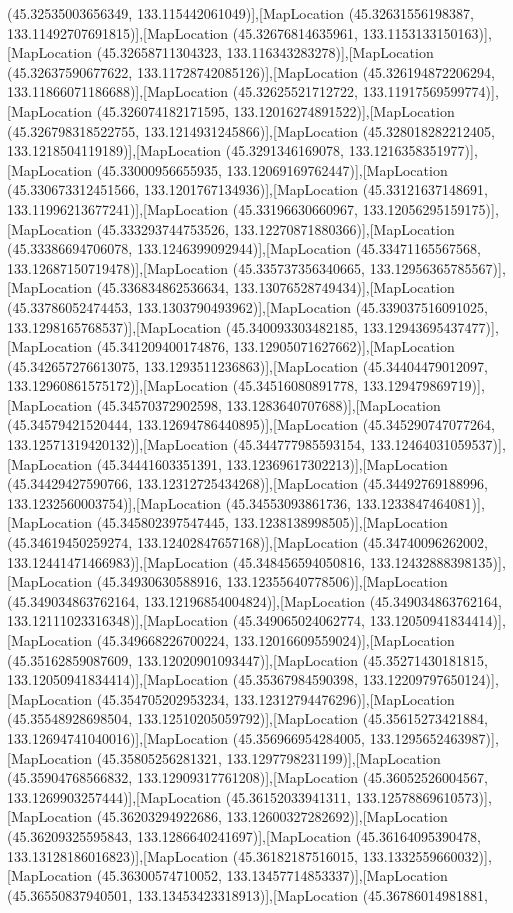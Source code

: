(45.32535003656349, 133.115442061049)],[MapLocation (45.32631556198387, 133.11492707691815)],[MapLocation (45.32676814635961, 133.1153133150163)],[MapLocation (45.32658711304323, 133.116343283278)],[MapLocation (45.32637590677622, 133.11728742085126)],[MapLocation (45.326194872206294, 133.11866071186688)],[MapLocation (45.32625521712722, 133.11917569599774)],[MapLocation (45.326074182171595, 133.12016274891522)],[MapLocation (45.326798318522755, 133.1214931245866)],[MapLocation (45.328018282212405, 133.1218504119189)],[MapLocation (45.3291346169078, 133.1216358351977)],[MapLocation (45.33000956655935, 133.12069169762447)],[MapLocation (45.330673312451566, 133.1201767134936)],[MapLocation (45.33121637148691, 133.11996213677241)],[MapLocation (45.33196630660967, 133.12056295159175)],[MapLocation (45.333293744753526, 133.12270871880366)],[MapLocation (45.33386694706078, 133.1246399092944)],[MapLocation (45.33471165567568, 133.12687150719478)],[MapLocation (45.335737356340665, 133.12956365785567)],[MapLocation (45.336834862536634, 133.13076528749434)],[MapLocation (45.33786052474453, 133.1303790493962)],[MapLocation (45.339037516091025, 133.1298165768537)],[MapLocation (45.340093303482185, 133.12943695437477)],[MapLocation (45.341209400174876, 133.12905071627662)],[MapLocation (45.342657276613075, 133.1293511236863)],[MapLocation (45.34404479012097, 133.12960861575172)],[MapLocation (45.34516080891778, 133.129479869719)],[MapLocation (45.34570372902598, 133.1283640707688)],[MapLocation (45.34579421520444, 133.12694786440895)],[MapLocation (45.345290747077264, 133.12571319420132)],[MapLocation (45.344777985593154, 133.12464031059537)],[MapLocation (45.34441603351391, 133.12369617302213)],[MapLocation (45.34429427590766, 133.12312725434268)],[MapLocation (45.34492769188996, 133.1232560003754)],[MapLocation (45.34553093861736, 133.1233847464081)],[MapLocation (45.345802397547445, 133.1238138998505)],[MapLocation (45.34619450259274, 133.12402847657168)],[MapLocation (45.34740096262002, 133.12441471466983)],[MapLocation (45.348456594050816, 133.12432888398135)],[MapLocation (45.34930630588916, 133.12355640778506)],[MapLocation (45.349034863762164, 133.12196854004824)],[MapLocation (45.349034863762164, 133.12111023316348)],[MapLocation (45.349065024062774, 133.12050941834414)],[MapLocation (45.349668226700224, 133.12016609559024)],[MapLocation (45.35162859087609, 133.12020901093447)],[MapLocation (45.35271430181815, 133.12050941834414)],[MapLocation (45.35367984590398, 133.12209797650124)],[MapLocation (45.354705202953234, 133.12312794476296)],[MapLocation (45.35548928698504, 133.12510205059792)],[MapLocation (45.35615273421884, 133.12694741040016)],[MapLocation (45.356966954284005, 133.1295652463987)],[MapLocation (45.35805256281321, 133.1297798231199)],[MapLocation (45.35904768566832, 133.12909317761208)],[MapLocation (45.36052526004567, 133.1269903257444)],[MapLocation (45.36152033941311, 133.12578869610573)],[MapLocation (45.36203294922686, 133.12600327282692)],[MapLocation (45.36209325595843, 133.1286640241697)],[MapLocation (45.36164095390478, 133.13128186016823)],[MapLocation (45.36182187516015, 133.1332559660032)],[MapLocation (45.36300574710052, 133.13457714853337)],[MapLocation (45.36550837940501, 133.13453423318913)],[MapLocation (45.36786014981881, 